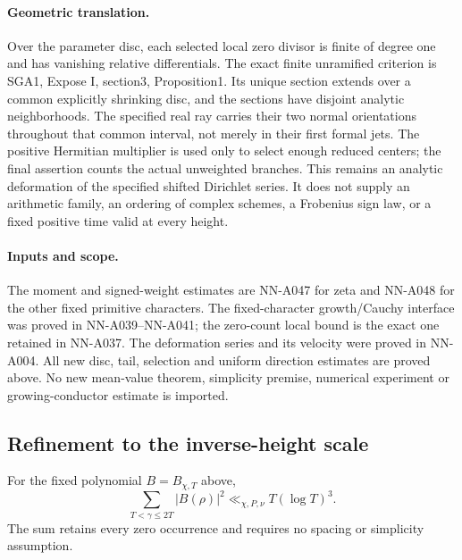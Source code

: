 \paragraph{Geometric translation.}
Over the parameter disc, each selected local zero divisor
is finite of degree one and has vanishing relative
differentials. The exact finite unramified criterion is
SGA1, Expose I, section3, Proposition1. Its unique section
extends over a common explicitly shrinking disc, and the
sections have disjoint analytic neighborhoods. The specified
real ray carries their two normal orientations throughout
that common interval, not merely in their first formal jets.
The positive Hermitian multiplier is used only to select
enough reduced centers; the final assertion counts the actual
unweighted branches. This remains an analytic deformation
of the specified shifted Dirichlet series. It does not
supply an arithmetic family, an ordering of complex schemes,
a Frobenius sign law, or a fixed positive time valid at every
height.

\paragraph{Inputs and scope.}
The moment and signed-weight estimates are NN-A047 for zeta
and NN-A048 for the other fixed primitive characters.
The fixed-character growth/Cauchy interface was proved in
NN-A039--NN-A041; the zero-count local bound is the exact
one retained in NN-A037. The deformation series and its
velocity were proved in NN-A004. All new disc, tail,
selection and uniform direction estimates are proved above.
No new mean-value theorem, simplicity premise, numerical
experiment or growing-conductor estimate is imported.

\subsection*{Refinement to the inverse-height scale}

\begin{lemma}
\label{lem:A049-sampling}
For the fixed polynomial \(B=B_{\chi,T}\) above,
\[
             \sum_{T<\gamma\le2T}|B(\rho)|^2
                          \ll_{\chi,P,\nu}T(\log T)^3.
\]
The sum retains every zero occurrence and requires no
spacing or simplicity assumption.
\end{lemma}

